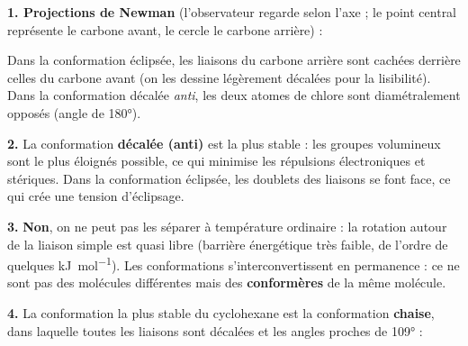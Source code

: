 \documentclass[11pt]{article}
\begin{document}
\begin{corrige}
\textbf{1. Projections de Newman} (l'observateur regarde selon l'axe  ; le point central représente le carbone avant, le cercle le carbone arrière) :
\begin{center}
\end{center}
Dans la conformation éclipsée, les liaisons du carbone arrière sont cachées derrière celles du carbone avant (on les dessine légèrement décalées pour la lisibilité). Dans la conformation décalée \emph{anti}, les deux atomes de chlore sont diamétralement opposés (angle de \ang{180}).

\textbf{2.} La conformation \textbf{décalée (anti)} est la plus stable : les groupes volumineux  sont le plus éloignés possible, ce qui minimise les répulsions électroniques et stériques. Dans la conformation éclipsée, les doublets des liaisons se font face, ce qui crée une tension d'éclipsage.

\textbf{3.} \textbf{Non}, on ne peut pas les séparer à température ordinaire : la rotation autour de la liaison simple  est quasi libre (barrière énergétique très faible, de l'ordre de quelques \si{kJ.mol^{-1}}). Les conformations s'interconvertissent en permanence : ce ne sont pas des molécules différentes mais des \textbf{conformères} de la même molécule.

\textbf{4.} La conformation la plus stable du cyclohexane est la conformation \textbf{chaise}, dans laquelle toutes les liaisons sont décalées et les angles proches de \ang{109} :
\begin{center}
\end{center}
\end{corrige}
\end{document}
